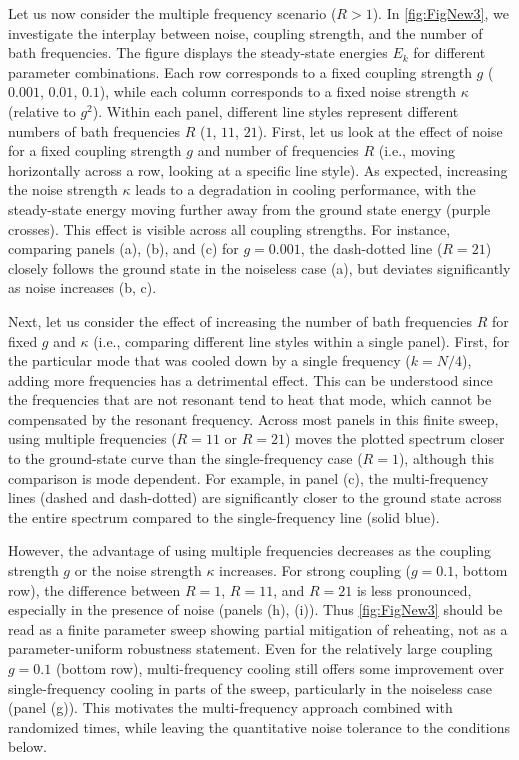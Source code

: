 \documentclass[aps,prx,twocolumn,superscriptaddress,nofootinbib,nolongbibliography,nobalancelastpage,10pt,floatfix]{revtex4-2}
\begin{document}
Let us now consider the multiple frequency scenario ($R>1$). In \cref{fig:FigNew3}, we investigate the interplay between noise, coupling strength, and the number of bath frequencies. The figure displays the steady-state energies $E_k$ for different parameter combinations. Each row corresponds to a fixed coupling strength $g$ ($0.001$, $0.01$, $0.1$), while each column corresponds to a fixed noise strength $\kappa$ (relative to $g^2$). Within each panel, different line styles represent different numbers of bath frequencies $R$ ($1$, $11$, $21$). First, let us look at the effect of noise for a fixed coupling strength $g$ and number of frequencies $R$ (i.e., moving horizontally across a row, looking at a specific line style). As expected, increasing the noise strength $\kappa$ leads to a degradation in cooling performance, with the steady-state energy moving further away from the ground state energy (purple crosses). This effect is visible across all coupling strengths. For instance, comparing panels (a), (b), and (c) for $g=0.001$, the dash-dotted line ($R=21$) closely follows the ground state in the noiseless case (a), but deviates significantly as noise increases (b, c).

Next, let us consider the effect of increasing the number of bath frequencies $R$ for fixed $g$ and $\kappa$ (i.e., comparing different line styles within a single panel). First, for the particular mode that was cooled down by a single frequency ($k=N/4$), adding more frequencies has a detrimental effect. This can be understood since the frequencies that are not resonant tend to heat that mode, which cannot be compensated by the resonant frequency. Across most panels in this finite sweep, using multiple frequencies ($R=11$ or $R=21$) moves the plotted spectrum closer to the ground-state curve than the single-frequency case ($R=1$), although this comparison is mode dependent. For example, in panel (c), the multi-frequency lines (dashed and dash-dotted) are significantly closer to the ground state across the entire spectrum compared to the single-frequency line (solid blue).

However, the advantage of using multiple frequencies decreases as the coupling strength $g$ or the noise strength $\kappa$ increases. For strong coupling ($g=0.1$, bottom row), the difference between $R=1$, $R=11$, and $R=21$ is less pronounced, especially in the presence of noise (panels (h), (i)). Thus \cref{fig:FigNew3} should be read as a finite parameter sweep showing partial mitigation of reheating, not as a parameter-uniform robustness statement. Even for the relatively large coupling $g=0.1$ (bottom row), multi-frequency cooling still offers some improvement over single-frequency cooling in parts of the sweep, particularly in the noiseless case (panel (g)). This motivates the multi-frequency approach combined with randomized times, while leaving the quantitative noise tolerance to the conditions below.
\end{document}
